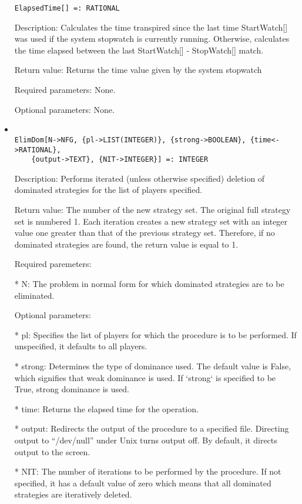 \begin{itemize}
\begin{verbatim}
ElapsedTime[] =: RATIONAL
\end{verbatim}

\bd
\item
[Description:] Calculates the time transpired since the last time 
StartWatch[] was used if the system stopwatch is currently running.
Otherwise, calculates the time elapsed between the last StartWatch[] -
StopWatch[] match.
\item
[Return value:] Returns the time value given by the system stopwatch
\item
[Required parameters:]  None.
\item   
[Optional parameters:] None.
\ed

\item
\begin{verbatim}

ElimDom[N->NFG, {pl->LIST(INTEGER)}, {strong->BOOLEAN}, {time<->RATIONAL},
	{output->TEXT}, {NIT->INTEGER}] =: INTEGER
\end{verbatim}

\bd
\item
[Description:] Performs iterated (unless otherwise specified) deletion 
of dominated strategies for the list of players specified.  
\item  
[Return value:] The number of the new strategy set.  The original full
strategy set is numbered 1.  Each iteration creates a new strategy set
with an integer value one greater than that of the previous strategy 
set.  Therefore, if no dominated strategies are found, the return value
is equal to 1.
\item
[Required paremeters:]
	
\bd
\item
[* N:] The problem in normal form for which dominated strategies are
to be eliminated.
\ed

\item
[Optional parameters:]\hfil\null

\bd
\item
[* pl:] Specifies the list of players for which the procedure is to
be performed.  If unspecified, it defaults to all players. 
\item
[* strong:] Determines the type of dominance used.  The default value
is False, which signifies that weak dominance is used.  If `strong` 
is specified to be True, strong dominance is used.  
\item
[* time:] Returns the elapsed time for the operation.
\item
[* output:] Redirects the output of the procedure to a specified 
file.  Directing output to ``/dev/null'' under Unix turns 
output off.  By default, it directs output to the screen.
\item
[* NIT:] The number of iterations to be performed by the procedure.
If not specified, it has a default value of zero which means 
that all dominated strategies are iteratively deleted.
\ed
\ed


\end{itemize}
